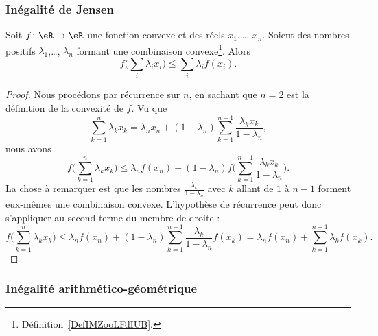 \subsubsection{Inégalité de Jensen}

\begin{proposition}    \label{PropXIBooLxTkhU}
    Soit \( f\colon \eR\to \eR\) une fonction convexe et des réels \( x_1\),\ldots,  \( x_n\). Soient des nombres positifs \( \lambda_1\),\ldots,  \( \lambda_n\) formant une combinaison convexe\footnote{Définition~\ref{DefIMZooLFdIUB}.}. Alors
    \begin{equation}
        f\big( \sum_i\lambda_ix_i \big)\leq \sum_i\lambda_if(x_i).
    \end{equation}
\end{proposition}

\begin{proof}
    Nous procédons par récurrence sur \( n\), en sachant que \( n=2\) est la définition de la convexité de \( f\). Vu que
    \begin{equation}
        \sum_{k=1}^n\lambda_kx_k=\lambda_nx_n+(1-\lambda_n)\sum_{k=1}^{n-1}\frac{ \lambda_kx_k }{ 1-\lambda_n },
    \end{equation}
    nous avons
    \begin{equation}
        f\big( \sum_{k=1}^n\lambda_kx_k \big)\leq \lambda_nf(x_n)+(1-\lambda_n)f\big( \sum_{k=1}^{n-1}\frac{ \lambda_kx_k }{ 1-\lambda_n } \big).
    \end{equation}
    La chose à remarquer est que les nombres \( \frac{ \lambda_k }{ 1-\lambda_n }\) avec \( k\) allant de \( 1\) à \( n-1\) forment eux-mêmes une combinaison convexe. L'hypothèse de récurrence peut donc s'appliquer au second terme du membre de droite :
    \begin{equation}
        f\big( \sum_{k=1}^n\lambda_kx_k \big)\leq \lambda_nf(x_n)+(1-\lambda_n)\sum_{k=1}^{n-1}\frac{ \lambda_k }{ 1-\lambda_n }f(x_k)=\lambda_nf(x_n)+\sum_{k=1}^{n-1}\lambda_kf(x_k).
    \end{equation}
\end{proof}

\subsubsection{Inégalité arithmético-géométrique}

